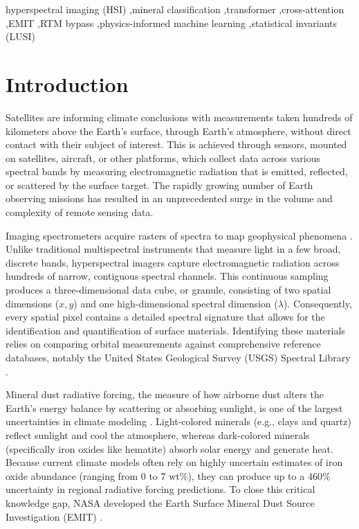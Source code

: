 \documentclass[preprint,12pt]{elsarticle}
\begin{document}
\begin{frontmatter}
\begin{keyword}
hyperspectral imaging (HSI) \sep mineral classification \sep transformer \sep cross-attention \sep EMIT \sep RTM bypass \sep physics-informed machine learning \sep statistical invariants (LUSI)
\end{keyword}

\end{frontmatter}

\section{Introduction}
\label{sec:intro}

Satellites are informing climate conclusions with measurements taken hundreds of kilometers above the Earth's surface, through Earth's atmosphere, without direct contact with their subject of interest.
This is achieved through sensors, mounted on satellites, aircraft, or other platforms, which collect data across various spectral bands by measuring electromagnetic radiation that is emitted, reflected, or scattered by the surface target.
The rapidly growing number of Earth observing missions has resulted in an unprecedented surge in the volume and complexity of remote sensing data.

Imaging spectrometers acquire rasters of spectra to map geophysical phenomena \cite{thompson_emit_2024}.
Unlike traditional multispectral instruments that measure light in a few broad, discrete bands, hyperspectral imagers capture electromagnetic radiation across hundreds of narrow, contiguous spectral channels.
This continuous sampling produces a three-dimensional data cube, or granule, consisting of two spatial dimensions ($x, y$) and one high-dimensional spectral dimension ($\lambda$).
Consequently, every spatial pixel contains a detailed spectral signature that allows for the identification and quantification of surface materials.
Identifying these materials relies on comparing orbital measurements against comprehensive reference databases, notably the United States Geological Survey (USGS) Spectral Library \cite{kokaly2017usgs}.

Mineral dust radiative forcing, the measure of how airborne dust alters the Earth's energy balance by scattering or absorbing sunlight, is one of the largest uncertainties in climate modeling \cite{ipcc_2021}.
Light-colored minerals (e.g., clays and quartz) reflect sunlight and cool the atmosphere, whereas dark-colored minerals (specifically iron oxides like hematite) absorb solar energy and generate heat.
Because current climate models often rely on highly uncertain estimates of iron oxide abundance (ranging from $0$ to $7\text{ wt}\%$), they can produce up to a $460\%$ uncertainty in regional radiative forcing predictions.
To close this critical knowledge gap, NASA developed the Earth Surface Mineral Dust Source Investigation (EMIT) \cite{emit_l1b_atbd}.
\end{document}
